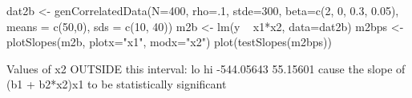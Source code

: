 \begin{Schunk}
\begin{Sinput}
 dat2b <- genCorrelatedData(N=400, rho=.1, stde=300, beta=c(2, 0, 0.3, 0.05), means = c(50,0), sds = c(10, 40))
 m2b <- lm(y ~ x1*x2, data=dat2b)
 m2bps <- plotSlopes(m2b, plotx="x1", modx="x2")
 plot(testSlopes(m2bps))
\end{Sinput}
\begin{Soutput}
Values of x2 OUTSIDE this interval:
        lo         hi 
-544.05643   55.15601 
cause the slope of (b1 + b2*x2)x1 to be statistically significant
\end{Soutput}
\end{Schunk}
